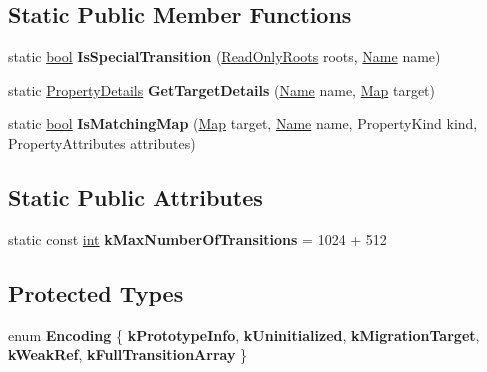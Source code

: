 \subsection*{Static Public Member Functions}
\begin{DoxyCompactItemize}
\item 
\mbox{\label{classv8_1_1internal_1_1TransitionsAccessor_aede4a2de26e976f2a511775419998888}} 
static \mbox{\hyperlink{classbool}{bool}} {\bfseries Is\+Special\+Transition} (\mbox{\hyperlink{classv8_1_1internal_1_1ReadOnlyRoots}{Read\+Only\+Roots}} roots, \mbox{\hyperlink{classv8_1_1internal_1_1Name}{Name}} name)
\item 
\mbox{\label{classv8_1_1internal_1_1TransitionsAccessor_a258e8c92172cdbb083e5708371929cb0}} 
static \mbox{\hyperlink{classv8_1_1internal_1_1PropertyDetails}{Property\+Details}} {\bfseries Get\+Target\+Details} (\mbox{\hyperlink{classv8_1_1internal_1_1Name}{Name}} name, \mbox{\hyperlink{classv8_1_1internal_1_1Map}{Map}} target)
\item 
\mbox{\label{classv8_1_1internal_1_1TransitionsAccessor_a918c4ebddb612375eeb24c4b67fb0dc7}} 
static \mbox{\hyperlink{classbool}{bool}} {\bfseries Is\+Matching\+Map} (\mbox{\hyperlink{classv8_1_1internal_1_1Map}{Map}} target, \mbox{\hyperlink{classv8_1_1internal_1_1Name}{Name}} name, Property\+Kind kind, Property\+Attributes attributes)
\end{DoxyCompactItemize}
\subsection*{Static Public Attributes}
\begin{DoxyCompactItemize}
\item 
\mbox{\label{classv8_1_1internal_1_1TransitionsAccessor_a8761aefac342e5acc8b3e13bd00b877e}} 
static const \mbox{\hyperlink{classint}{int}} {\bfseries k\+Max\+Number\+Of\+Transitions} = 1024 + 512
\end{DoxyCompactItemize}
\subsection*{Protected Types}
\begin{DoxyCompactItemize}
\item 
\mbox{\label{classv8_1_1internal_1_1TransitionsAccessor_a9681ec16adaf752faf5f210ad3e72b1f}} 
enum {\bfseries Encoding} \{ \newline
{\bfseries k\+Prototype\+Info}, 
{\bfseries k\+Uninitialized}, 
{\bfseries k\+Migration\+Target}, 
{\bfseries k\+Weak\+Ref}, 
\newline
{\bfseries k\+Full\+Transition\+Array}
 \}
\end{DoxyCompactItemize}
